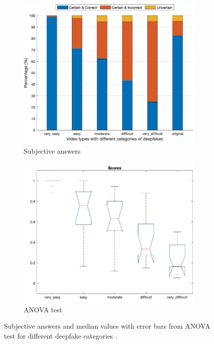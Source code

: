 \begin{figure}[ht]
    \begin{subfigure}[h]{.45\linewidth}
        \centering
        \includegraphics[width=1\linewidth]{other-fig/subjective_answers_a.png}
        \caption{Subjective answers}
    \end{subfigure}
    \hfill
    \begin{subfigure}[h]{.45\linewidth}
        \centering
        \includegraphics[width=1\linewidth]{other-fig/subjective_answers_b.png}
        \caption{ANOVA test}
    \end{subfigure}
    \caption{Subjective answers and median values with error bars from ANOVA test for different deepfake categories \cite{TheThreatOfDeepfakes}.}
    \label{fig:subjective_answers}
\end{figure}

